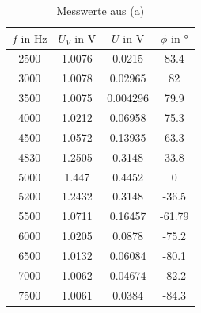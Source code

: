 \documentclass[a4paper, 12pt]{article}
\begin{document}
      \begin{table}[H]
      \begin{center}
        \begin{tabular}{@{}cccc@{}}
        \toprule
          $f \text{ in } \si{\hertz} $   &    $ U_V \text{ in } \si{\volt}$    &     $ U \text{ in } \si{\volt}$     &     $ \phi \text{ in } \si{\degree}$   \\ \midrule
        2500 & 1.0076 & 0.0215   & 83.4   \\
        3000 & 1.0078 & 0.02965  & 82     \\
        3500 & 1.0075 & 0.004296 & 79.9   \\
        4000 & 1.0212 & 0.06958  & 75.3   \\
        4500 & 1.0572 & 0.13935  & 63.3   \\
        4830 & 1.2505 & 0.3148   & 33.8   \\
        5000 & 1.447  & 0.4452   & 0      \\
        5200 & 1.2432 & 0.3148   & -36.5  \\
        5500 & 1.0711 & 0.16457  & -61.79 \\
        6000 & 1.0205 & 0.0878   & -75.2  \\
        6500 & 1.0132 & 0.06084  & -80.1  \\
        7000 & 1.0062 & 0.04674  & -82.2  \\
        7500 & 1.0061 & 0.0384   & -84.3  \\ \bottomrule
        \end{tabular}
        \caption*{Messwerte aus (a)}
      \end{center}
      \end{table}
\end{document}
